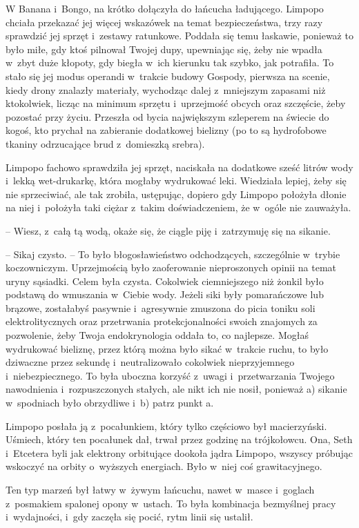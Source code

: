 \documentclass[oneside,polish,11pt,sfheadings]{mwbk}
\begin{document}
W Banana i~Bongo, na krótko dołączyła do łańcucha ładującego. Limpopo
chciała przekazać jej więcej wskazówek na temat bezpieczeństwa, trzy
razy sprawdzić jej sprzęt i~zestawy ratunkowe. Poddała się temu
łaskawie, ponieważ to było miłe, gdy ktoś pilnował Twojej dupy,
upewniając się, żeby nie wpadła w~zbyt duże kłopoty, gdy biegła w~ich
kierunku tak szybko, jak potrafiła. To stało się jej modus operandi w~trakcie budowy Gospody, pierwsza na scenie, kiedy drony znalazły
materiały, wychodząc dalej z~mniejszym zapasami niż ktokolwiek, licząc
na minimum sprzętu i~uprzejmość obcych oraz szczęście, żeby pozostać
przy życiu. Przeszła od bycia największym szleperem na świecie do kogoś,
kto prychał na zabieranie dodatkowej bielizny (po to są hydrofobowe
tkaniny odrzucające brud z~domieszką srebra).

Limpopo fachowo sprawdziła jej sprzęt, naciskała na dodatkowe sześć
litrów wody i~lekką wet-drukarkę, która mogłaby wydrukować leki.
Wiedziała lepiej, żeby się nie sprzeciwiać, ale tak zrobiła, ustępując,
dopiero gdy Limpopo położyła dłonie na niej i~położyła taki ciężar z~takim doświadczeniem, że w~ogóle nie zauważyła. 

-- Wiesz, z~całą tą wodą,
okaże się, że ciągle piję i~zatrzymuję się na sikanie.

-- Sikaj czysto. -- To było błogosławieństwo odchodzących, szczególnie w~trybie koczowniczym. Uprzejmością było zaoferowanie nieproszonych opinii
na temat uryny sąsiadki. Celem była czysta. Cokolwiek ciemniejszego niż
żonkil było podstawą do wmuszania w~Ciebie wody. Jeżeli siki były
pomarańczowe lub brązowe, zostałabyś pasywnie i~agresywnie zmuszona do
picia toniku soli elektrolitycznych oraz przetrwania protekcjonalności
swoich znajomych za pozwolenie, żeby Twoja endokrynologia oddała to, co
najlepsze. Mogłaś wydrukować bieliznę, przez którą można było sikać w~trakcie ruchu, to było dziwaczne przez sekundę i~neutralizowało
cokolwiek nieprzyjemnego i~niebezpiecznego. To była uboczna korzyść z~uwagi i~przetwarzania Twojego nawodnienia i~rozpuszczonych stałych, ale
nikt ich nie nosił, ponieważ a) sikanie w~spodniach było obrzydliwe i~b)
patrz punkt a.

Limpopo posłała ją z~pocałunkiem, który tylko częściowo był
macierzyński. Uśmiech, który ten pocałunek dał, trwał przez godzinę na
trójkołowcu. Ona, Seth i~Etcetera byli jak elektrony orbitujące dookoła
jądra Limpopo, wszyscy próbując wskoczyć na orbity o~wyższych energiach.
Było w~niej coś grawitacyjnego.

Ten typ marzeń był łatwy w~żywym łańcuchu, nawet w~masce i~goglach z~posmakiem spalonej opony w~ustach. To była kombinacja bezmyślnej pracy i~wydajności, i~gdy zaczęła się pocić, rytm linii się ustalił.
\end{document}
